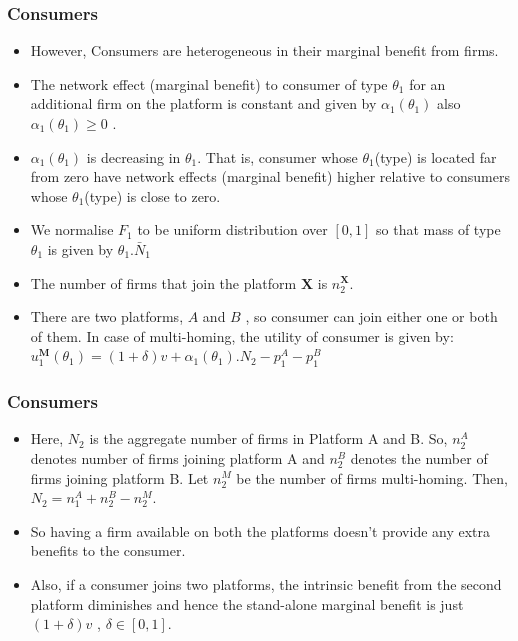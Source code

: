 \documentclass[11pt]{beamer}
\theoremstyle{boldstyle}
\begin{document}
		\begin{frame}
			\frametitle{Consumers}
			\begin{small}
				\begin{itemize}
					\item  However, Consumers are heterogeneous in their marginal benefit from firms. 
					\item  The network effect (marginal benefit) to consumer of type $\theta_1$ for an additional firm on the platform is constant and given by $\alpha_1(\theta_1)$ also $\alpha_1(\theta_1) \geq 0$ . 
					\item $\alpha_1(\theta_1)$ is decreasing in $\theta_1$. That is, consumer whose $\theta_1$(type) is located far from zero have network effects (marginal benefit) higher relative to consumers whose $\theta_1$(type) is close to zero.
					\item We normalise $F_1$ to be uniform distribution over $[0,1]$ so that mass of type $\theta_1$ is given by $\theta_1. \bar{N}_1$ 
					\item The number of firms that join the platform $\mathbf{X}$ is $n_2^{\mathbf{X}}$.  
					\item There are two platforms, $A$ and $B$ , so consumer can join either one or both of them. In case of multi-homing, the utility of consumer is given by: $u_1^{\mathbf{M}}(\theta_1) = (1+\delta)v+\alpha_1(\theta_1).N_2-p_1^{A} - p_1^{B}$ 
				\end{itemize}
			\end{small}
		\end{frame}
		
		
				\begin{frame}
			\frametitle{Consumers }
			\begin{small}
				\begin{itemize}
					\item  Here, $N_2$ is the aggregate number of firms in Platform A and B. So, $n_2^A$ denotes number of firms joining platform A and $n_2^B$ denotes the number of firms joining platform B. Let $n_2^M$ be the number of firms multi-homing. Then, $N_2=n_1^A+n_2^B - n_2^M$. 
					\item  So having a firm available on both the platforms doesn't provide any extra benefits to the consumer. 
					\item Also, if a consumer joins two platforms, the intrinsic benefit from the second platform diminishes and hence the stand-alone marginal benefit is just $(1+\delta)v$ , $\delta \in [0,1]$. 
					
					
				\end{itemize}
			\end{small}
		\end{frame}
				
\end{document}
